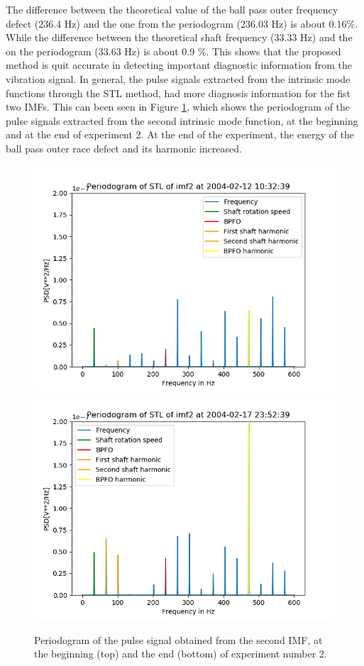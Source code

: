 \documentclass[../Main/thesis.tex]{subfiles}
\begin{document}
\justify
The difference between the theoretical value of the ball pass outer frequency defect (236.4 Hz) and the one from the periodogram (236.03 Hz) is about 0.16$\%$. While the difference between the theoretical shaft frequency (33.33 Hz) and the on the periodogram (33.63 Hz) is about 0.9 $\%$. This shows that the proposed method is quit accurate in detecting important diagnostic information from the vibration signal.
\justify
In general, the pulse signals extracted from the intrinsic mode functions through the STL method, had more diagnosis information for the fist two IMFs. This can been seen in Figure \ref{fig:startimf2bpfo}, which shows the periodogram of the pulse signals extracted from the second intrinsic mode function, at the beginning and at the end of experiment 2. At the end of the experiment, the energy of the ball pass outer race defect and its harmonic increased.
\justify

 \begin{figure}[H]
	\centering
	\includegraphics[width=0.8\linewidth]{../fig/periodogram_bpfo/start_imf2_bpfo}
	\includegraphics[width=0.8\linewidth]{../fig/periodogram_bpfo/end_imf2_bpfo}
	\caption{Periodogram of the pulse signal obtained from the second IMF, at the beginning (top) and the end (bottom) of experiment number 2.}
	\label{fig:startimf2bpfo}
\end{figure}
\end{document}
